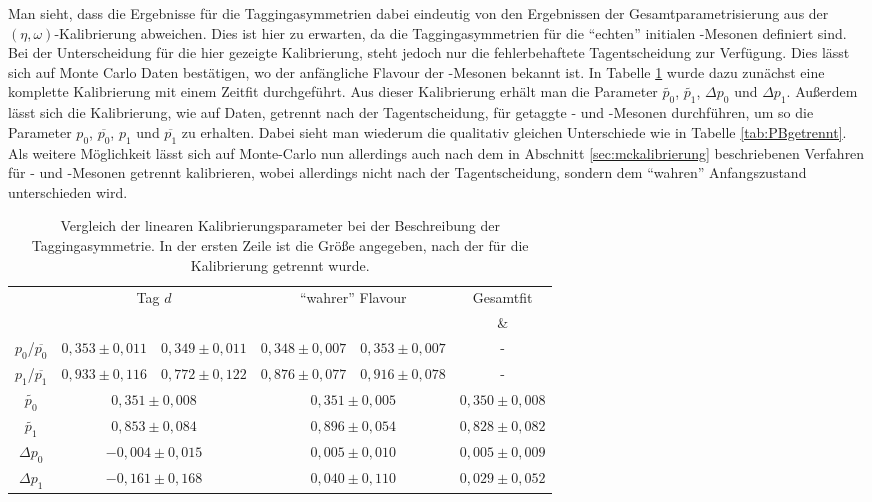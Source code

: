 Man sieht, dass die Ergebnisse für die Taggingasymmetrien dabei eindeutig von den Ergebnissen der Gesamtparametrisierung aus der $(\eta,\omega)$-Kalibrierung abweichen. Dies ist hier zu erwarten, da die Taggingasymmetrien für die \enquote{echten} initialen \B-Mesonen definiert sind. Bei der Unterscheidung für die hier gezeigte Kalibrierung, steht jedoch nur die fehlerbehaftete Tagentscheidung zur Verfügung. Dies lässt sich auf Monte Carlo Daten bestätigen, wo der anfängliche Flavour der \B-Mesonen bekannt ist. In Tabelle \ref{tab:mcgetrennt} wurde dazu zunächst eine komplette Kalibrierung mit einem Zeitfit durchgeführt. Aus dieser Kalibrierung erhält man die Parameter $\widetilde{p_0}$, $\widetilde{p_1}$, $\Delta p_0$ und $\Delta p_1$. Außerdem lässt sich die Kalibrierung, wie auf Daten, getrennt nach der Tagentscheidung, für getaggte \Bz- und \Bzb-Mesonen durchführen, um so die Parameter $p_0$, $\overline{p_0}$, $p_1$ und $\overline{p_1}$ zu erhalten. Dabei sieht man wiederum die qualitativ gleichen Unterschiede wie in Tabelle \ref{tab:PBgetrennt}. Als weitere Möglichkeit lässt sich auf Monte-Carlo nun allerdings auch nach dem in Abschnitt \ref{sec:mckalibrierung} beschriebenen Verfahren für \Bz- und \Bzb-Mesonen getrennt kalibrieren, wobei allerdings nicht nach der Tagentscheidung, sondern dem \enquote{wahren} Anfangszustand unterschieden wird.
\begin{table}[htbp]
	\centering
	\small
	\caption{Vergleich der linearen Kalibrierungsparameter bei der Beschreibung der Taggingasymmetrie. In der ersten Zeile ist die Größe angegeben, nach der für die Kalibrierung getrennt wurde.}
	\label{tab:mcgetrennt} 
	\begin{tabular}{c|ccccc}
	\toprule
	 & \multicolumn{2}{c}{Tag $d$} & \multicolumn{2}{c}{\enquote{wahrer} Flavour} & Gesamtfit \\
	 & \Bzb & \Bz & \Bzb & \Bz & \Bzb \& \Bz \\ 
	 \midrule
      $p_0$/$\overline{p_0}$  & $0{,}353\pm0{,}011$ & $0{,}349\pm0{,}011$ & $0{,}348\pm0{,}007$ & $0{,}353\pm0{,}007$ & - \\  
      $p_1$/$\overline{p_1}$ & $0{,}933\pm0{,}116$ & $0{,}772\pm0{,}122$ & $0{,}876\pm0{,}077$ & $0{,}916\pm0{,}078$ & - \\
      $\widetilde{p_0}$ & \multicolumn{2}{c}{$0{,}351\pm0{,}008$} & \multicolumn{2}{c}{$0{,}351\pm0{,}005$} &  $0{,}350\pm0{,}008$ \\
      $\widetilde{p_1}$ &  \multicolumn{2}{c}{$0{,}853\pm0{,}084$} & \multicolumn{2}{c}{$0{,}896\pm0{,}054$} & $0{,}828\pm0{,}082$ \\
      $\Delta p_0$ & \multicolumn{2}{c}{$-0{,}004\pm0{,}015$} & \multicolumn{2}{c}{$0{,}005\pm0{,}010$} & $0{,}005\pm0{,}009$ \\
      $\Delta p_1$ & \multicolumn{2}{c}{$-0{,}161\pm0{,}168$} & \multicolumn{2}{c}{$0{,}040\pm0{,}110$} & $0{,}029\pm0{,}052$ \\ 
      \bottomrule
	\end{tabular}
\end{table}
